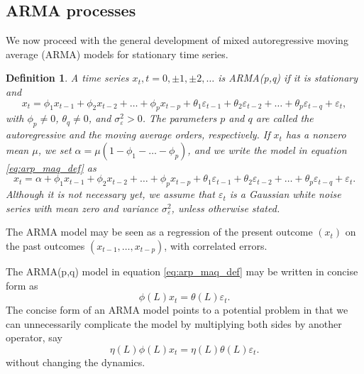 \documentclass[
paper=128mm:96mm, %
fontsize=9.5pt, %
pagesize, %
parskip=half-, %
]{scrartcl} %
\theoremstyle{mythmstyle} %
\newtheorem{definition}[theorem]{Definition} %
\begin{document}
\subsection{ARMA processes}


We now proceed with the general development of mixed autoregressive moving average (ARMA) models for stationary time series.

\begin{definition}
A time series ${x_t, t = 0, \pm1, \pm2,\dots}$ is ARMA(p,q) if it is stationary and
%
\begin{equation}
\label{eq:arp_maq_def}
x_t=\phi_1x_{t-1}+\phi_2x_{t-2} +\dots+\phi_px_{t-p}+ \theta_1\varepsilon_{t-1}+\theta_2\varepsilon_{t-2} +\dots+\theta_p\varepsilon_{t-q}+\varepsilon_t,
\end{equation}
%
with $\phi_p\neq 0$, $\theta_q\neq 0$, and $\sigma_\varepsilon^2>0$. The parameters $p$ and $q$ are called the autoregressive and the moving average orders, respectively. If $x_t$ has a nonzero mean $\mu$, we set $\alpha=\mu\left(1-\phi_1-\dots-\phi_p\right)$, and we write the model in equation \eqref{eq:arp_maq_def} as
%
\begin{equation}
\label{eq:arp_maq_def_2}
x_t=\alpha+\phi_1x_{t-1}+\phi_2x_{t-2} +\dots+\phi_px_{t-p}+ \theta_1\varepsilon_{t-1}+\theta_2\varepsilon_{t-2} +\dots+\theta_p\varepsilon_{t-q}+\varepsilon_t.
\end{equation}
%
Although it is not necessary yet, we assume that $\varepsilon_t$ is a Gaussian white noise
series with mean zero and variance $\sigma_\varepsilon^2$, unless otherwise stated.
\end{definition}
\clearpage

The ARMA model may be seen as a regression of the present outcome $(x_t)$ on the past outcomes $\left(x_{t-1},\dots, x_{t-p}\right)$, with correlated errors.

The ARMA(p,q) model in equation \eqref{eq:arp_maq_def} may be written in concise form as
%
\begin{equation}
\label{eq:arp_maq_def_3}
\phi\left(L\right)x_t=\theta\left(L\right)\varepsilon_t.
\end{equation}
%
The concise form of an ARMA model points to a potential problem in that we can unnecessarily complicate the model by multiplying both sides by another operator, say
%
\begin{equation}
\label{eq:arp_maq_def_4}
\eta\left(L\right)\phi\left(L\right)x_t=\eta\left(L\right)\theta\left(L\right)\varepsilon_t.
\end{equation}
%
without changing the dynamics. 
\clearpage
\end{document}
